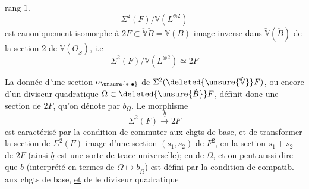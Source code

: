 rang $1$.
\[
\Sigma^2(F)/\mathbb V(L^{\otimes2})
\]
est canoniquement isomorphe à $2F\subset\check{\mathbb V}\check B=\mathbb V(B)$
image inverse dans $\check{\mathbb V}(\check B)$ de la section $2$
de $\check{\mathbb V}(\underline O_S)$, i.e
\[
\Sigma^2(F)/\mathbb V(L^{\otimes2})\simeq 2F \tag*{(39)}
\]

 La donnée d'une section $\sigma_{\unsure{*|\bullet}}$ de
$\Sigma^2(\deleted{\unsure{\check{\mathbb V}}}F)$, ou encore d'un diviseur quadratique
$\Omega\subset\deleted{\unsure{\check B}}F$,  définit donc une section de
$2F$, qu'on  dénote par
$b_\Omega$.  Le morphisme
\[
\Sigma^2(F)\xrightarrow{\underline b}2F \tag*{(40)}
\]
est caractérisé par la condition de commuter
aux chgts de base, et de transformer
la section de $\Sigma^2(F)$ image d'une section
$(s_1,s_2)$ de $F^2$, en la section $s_1+s_2$ de $2F$
(ainsi $\underline b$ est une sorte de \uline{trace universelle});
en  de $\Omega$, et on peut aussi dire
que $\underline b$ (interprété en termes de
$\Omega\longmapsto \underline b_\Omega$) est défini par la condition de
compatib. aux chgts de base, \uline{et}  de
 le  diviseur quadratique


